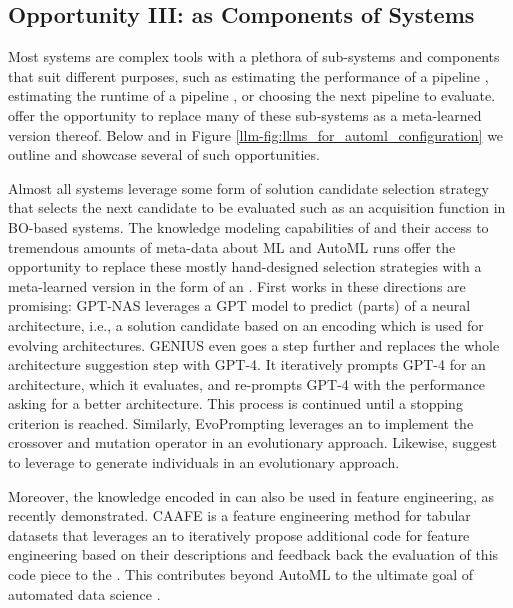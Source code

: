 \subsection{Opportunity III: \LLMs as Components of \AutoML Systems}
\label{llm-ssec:llms-for-simulating-automl}

Most \AutoML systems are complex tools with a plethora of sub-systems and components that suit different purposes, such as estimating the performance of a pipeline \cite{white-neurips21a}, estimating the runtime of a pipeline \cite{mohr-tpami21a}, or choosing the next pipeline to evaluate. \LLMs offer the opportunity to replace many of these sub-systems as a meta-learned version thereof. Below and in Figure \ref{llm-fig:llms_for_automl_configuration} we outline and showcase several of such opportunities.

Almost all \AutoML systems leverage some form of solution candidate selection strategy that selects the next candidate to be evaluated such as an acquisition function in BO-based systems. The knowledge modeling capabilities of \LLMs and their access to tremendous amounts of meta-data about ML and AutoML runs offer the opportunity to replace these mostly hand-designed selection strategies with a meta-learned version in the form of an \LLM. First works in these directions are promising: GPT-NAS \cite{yu2023gptnas} leverages a GPT model to predict (parts) of a neural architecture, i.e., a solution candidate based on an encoding which is used for evolving architectures. GENIUS \cite{zheng2023gpt4} even goes a step further and replaces the whole architecture suggestion step with GPT-4. It iteratively prompts GPT-4 for an architecture, which it evaluates, and re-prompts GPT-4 with the performance asking for a better architecture. This process is continued until a stopping criterion is reached. Similarly, EvoPrompting \cite{chen2023evoprompting} leverages an \LLM to implement the crossover and mutation operator in an evolutionary \NAS approach. Likewise, \citet{nasier-arxiv23a} suggest to leverage \LLMs to generate individuals in an evolutionary \NAS approach.

Moreover, the knowledge encoded in \LLMs can also be used in feature engineering, as recently demonstrated. CAAFE \cite{hollmann2023gpt} is a feature engineering method for tabular datasets that leverages an \LLM to iteratively propose additional code for feature engineering based on their descriptions and feedback back the evaluation of this code piece to the \LLMs. This contributes beyond AutoML to the ultimate goal of automated data science \cite{bie-cacm22a}.

